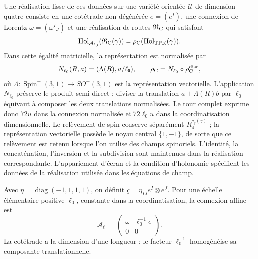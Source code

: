Une réalisation lisse de ces données sur une variété orientée \(\mathcal U\) de dimension quatre consiste en une cotétrade non dégénérée \(e=(e^I)\), une connexion de Lorentz \(\omega=(\omega^I{}_J)\) et une réalisation de routes \(\mathfrak R_{\rm C}\) qui satisfont
\begin{equation}
 \operatorname{Hol}_{\mathcal A_{\ell_0}}
       (\mathfrak R_{\rm C}(\gamma))
 =\rho_{\rm C}(\operatorname{Hol}_{\rm TPK}(\gamma)).
 \label{vii:eq:compatibilidad-holonomia-geometrica}
\end{equation}
Dans cette égalité matricielle, la représentation est normalisée par
\[
 N_{\ell_0}(R,a)=(\Lambda(R),a/\ell_0),\qquad
 \rho_{\rm C}=N_{\ell_0}\circ\rho_{\rm C}^{\rm disc},
\]
où \(\Lambda:\operatorname{Spin}^+(3,1)\to SO^+(3,1)\) est la représentation vectorielle. L'application \(N_{\ell_0}\) préserve le produit semi-direct : diviser la translation \(a+\Lambda(R)b\) par \(\ell_0\) équivaut à composer les deux translations normalisées. Le tour complet exprime donc \(72u\) dans la connexion normalisée et \(72\ell_0u\) dans la coordinatisation dimensionnelle. Le relèvement de spin conserve séparément \(R_4^{c_g(\gamma)}\) ; la représentation vectorielle possède le noyau central \(\{1,-1\}\), de sorte que ce relèvement est retenu lorsque l'on utilise des champs spinoriels. L'identité, la concaténation, l'inversion et la subdivision sont maintenues dans la réalisation correspondante. L'appariement d'écran et la condition d'holonomie spécifient les données de la réalisation utilisée dans les équations de champ.

Avec \(\eta=\operatorname{diag}(-1,1,1,1)\), on définit
\(g=\eta_{IJ}e^I\otimes e^J\). Pour une échelle élémentaire
positive \(\ell_0\), constante dans la coordinatisation, la connexion affine est
\begin{equation}
 \mathcal A_{\ell_0}
 =\begin{pmatrix}\omega&\ell_0^{-1}e\\0&0\end{pmatrix}.
 \label{vii:eq:conexion-afin-realizada}
\end{equation}
La cotétrade a la dimension d'une longueur ; le facteur \(\ell_0^{-1}\) homogénéise sa composante translationnelle.

